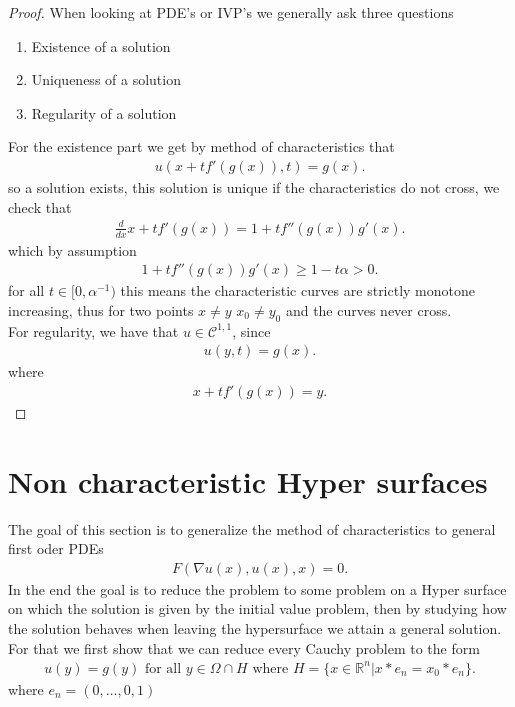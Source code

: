 \begin{proof}
 When looking at PDE's or IVP's we generally ask three questions 
 \begin{enumerate}
  \item Existence of  a solution 
  \item Uniqueness of a solution 
  \item Regularity of a solution 
 \end{enumerate}
 For the existence part we get by method of characteristics that 
 \begin{align*}
  u(x+t f'(g(x)),t) =  g(x)
 .\end{align*}
 so a solution exists, this solution is unique if the characteristics do not cross, we check that 
 \begin{align*}
  \frac{d}{dx} x + t f'(g(x)) = 1 + t f''(g(x))g'(x)
 .\end{align*}
 which by assumption 
 \begin{align*}
  1 + t f''(g(x))g'(x) \ge  1- t \alpha  > 0
 .\end{align*}
 for all $t \in  [0,\alpha ^{-1} )$ this means the characteristic curves are strictly monotone increasing,
 thus for two points $x\neq y$ $x_{0} \neq y_{0}$ and the curves never cross.\\
 For regularity, we have that $u \in  \mathcal{C}^{1,1} $, since 
 \begin{align*}
  u(y,t) = g(x) 
 .\end{align*}
 where 
 \begin{align*}
  x + t f'(g(x)) = y
 .\end{align*}
\end{proof}
\section{Non characteristic Hyper surfaces }
The goal of this section is to generalize the method of characteristics to general first oder PDEs 
\begin{align*}
  F(\nabla u(x),u(x),x)=0
.\end{align*}
In the end the goal is to reduce the problem to some problem on a Hyper surface on which the solution is given by the initial value problem, then by studying how the solution behaves when leaving the hypersurface
we attain a general solution. For that we first show that we can reduce every Cauchy problem  to the form 
\begin{align*}
  u(y) = g(y) \text{ for all } y \in  \Omega  \cap H \text{ where } H = \{x \in  \mathbb{R}^{n} | x*e_n  = x_{0}*e_n \}  
.\end{align*}
where  $e_n = (0,\ldots ,0,1)$ 
